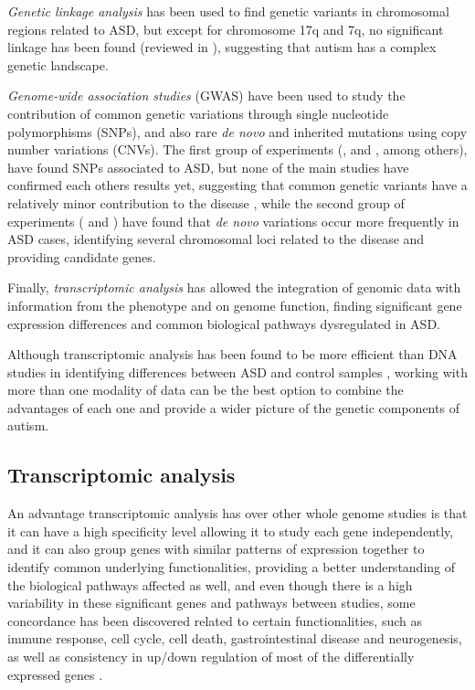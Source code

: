 \textit{Genetic linkage analysis} has been used to find genetic variants in chromosomal regions related to ASD, but except for chromosome 17q and 7q, no significant linkage has been found (reviewed in \cite{abrahams_advances_2008}), suggesting that autism has a complex genetic landscape.

\textit{Genome-wide association studies} (GWAS) have been used to study the contribution of common genetic variations through single nucleotide polymorphisms (SNPs), and also rare \textit{de novo} and inherited mutations using copy number variations (CNVs). The first group of experiments (\cite{wang_common_2009}, \cite{weiss_genome-wide_2009} and \cite{anney_genome-wide_2010}, among others),  have found SNPs associated to ASD, but none of the main studies have confirmed each others results yet, suggesting that common genetic variants have a relatively minor contribution to the disease \cite{voineagu_gene_2012}, while the second group of experiments (\cite{morrow_identifying_2008} and \cite{sebat_strong_2007}) have found that \textit{de novo} variations occur more frequently in ASD cases, identifying several chromosomal loci related to the disease and providing candidate genes.

Finally, \textit{transcriptomic analysis} has allowed the integration of genomic data with information from the phenotype and on genome function, finding significant gene expression differences and common biological pathways dysregulated in ASD.

Although transcriptomic analysis has been found to be more efficient than DNA studies in identifying differences between ASD and control samples \cite{voineagu_gene_2012}, working with more than one modality of data can be the best option to combine the advantages of each one and provide a wider picture of the genetic components of autism.

\subsection{Transcriptomic analysis}
An advantage transcriptomic analysis has over other whole genome studies is that it can have a high specificity level allowing it to study each gene independently, and it can also group genes with similar patterns of expression together to identify common underlying functionalities, providing a better understanding of the biological pathways affected as well, and even though there is a high variability in these significant genes and pathways between studies, some concordance has been discovered related to certain functionalities, such as immune response, cell cycle, cell death, gastrointestinal disease and neurogenesis, as well as consistency in up/down regulation of most of the differentially expressed genes \cite{ansel_variation_2017}.

